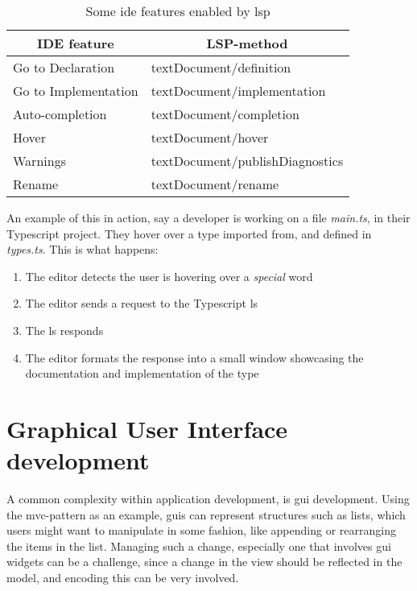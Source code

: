 \begin{table}[H]
  \caption{Some \gls*{ide} features enabled by \gls*{lsp}}
  \label{tbl:ide}
  \begin{center}
    \begin{tabular}[c]{l|l}
      \hline
      \multicolumn{1}{c|}{\textbf{IDE feature}} & 
      \multicolumn{1}{c}{\textbf{LSP-method}} \\
      \hline
      \hline
      Go to Declaration & textDocument/definition \\ \hline
      Go to Implementation & textDocument/implementation \\ \hline
      Auto-completion & textDocument/completion \\ \hline
      Hover & textDocument/hover \\ \hline
      Warnings & textDocument/publishDiagnostics \\ \hline
      Rename & textDocument/rename \\ \hline
    \end{tabular}
  \end{center}
\end{table}

An example of this in action, say a developer is working on a file
\textit{main.ts}, in their Typescript project. They hover over a type imported
from, and defined in \textit{types.ts}. This is what happens:

\begin{enumerate}
  \item The editor detects the user is hovering over a \textit{special} word
  \item The editor sends a request to the Typescript \gls*{ls}
  \item The \gls*{ls} responds
  \item The editor formats the response into a small window showcasing the
    documentation and implementation of the type
\end{enumerate}


\section{Graphical User Interface development} \label{sec:guid}

A common complexity within application development, is \gls*{gui} development.
Using the \gls*{mvc}-pattern as an example, \gls*{gui}s can represent structures
such as lists, which users might want to manipulate in some fashion, like
appending or rearranging the items in the list. Managing such a change,
especially one that involves \gls*{gui} widgets can be a challenge, since a
change in the view should be reflected in the model, and encoding this can be
very involved.

